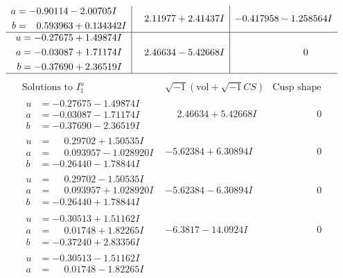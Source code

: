 \documentclass[1p]{elsarticle_modified}
\theoremstyle{definition}
\newcommand{\I}{\sqrt{-1}}
\begin{document}
$$\begin{array}{c|c|c}
\begin{aligned}
a &= -0.90114 - 2.00705 I \\
b &= \phantom{-}0.593963 + 0.134342 I\end{aligned}
 & \phantom{-}2.11977 + 2.41437 I & -0.417958 - 1.258564 I \\ \hline\begin{aligned}
u &= -0.27675 + 1.49874 I \\
a &= -0.03087 + 1.71174 I \\
b &= -0.37690 + 2.36519 I\end{aligned}
 & \phantom{-}2.46634 - 5.42668 I & \phantom{-0.000000 } 0\\
 \hline 
 \end{array}$$\newpage$$\begin{array}{c|c|c}  
\text{Solutions to }I^u_{1}& \I (\text{vol} + \sqrt{-1}CS) & \text{Cusp shape}\\
 \hline 
\begin{aligned}
u &= -0.27675 - 1.49874 I \\
a &= -0.03087 - 1.71174 I \\
b &= -0.37690 - 2.36519 I\end{aligned}
 & \phantom{-}2.46634 + 5.42668 I & \phantom{-0.000000 } 0 \\ \hline\begin{aligned}
u &= \phantom{-}0.29702 + 1.50535 I \\
a &= \phantom{-}0.093957 - 1.028920 I \\
b &= -0.26440 - 1.78844 I\end{aligned}
 & -5.62384 + 6.30894 I & \phantom{-0.000000 } 0 \\ \hline\begin{aligned}
u &= \phantom{-}0.29702 - 1.50535 I \\
a &= \phantom{-}0.093957 + 1.028920 I \\
b &= -0.26440 + 1.78844 I\end{aligned}
 & -5.62384 - 6.30894 I & \phantom{-0.000000 } 0 \\ \hline\begin{aligned}
u &= -0.30513 + 1.51162 I \\
a &= \phantom{-}0.01748 + 1.82265 I \\
b &= -0.37240 + 2.83356 I\end{aligned}
 & -6.3817 - 14.0924 I & \phantom{-0.000000 } 0 \\ \hline\begin{aligned}
u &= -0.30513 - 1.51162 I \\
a &= \phantom{-}0.01748 - 1.82265 I \\

\end{aligned}
\end{array}$$
\end{document}
